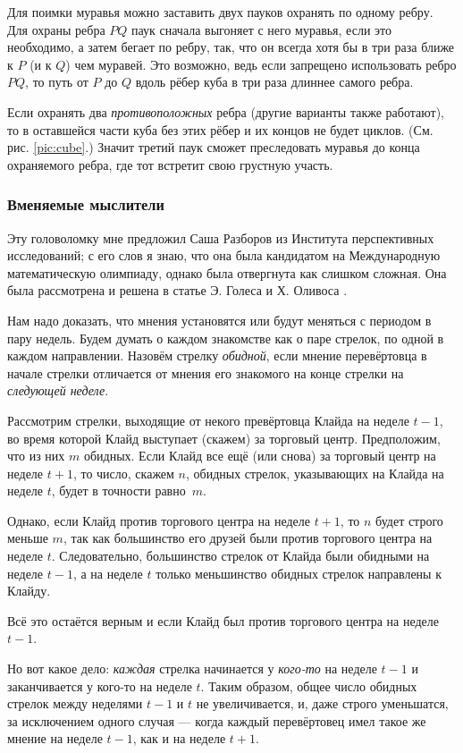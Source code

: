 Для поимки муравья можно заставить двух пауков охранять по одному ребру.
Для охраны ребра $PQ$ паук сначала выгоняет с него муравья, если это необходимо, а затем бегает по ребру, так, что он всегда хотя бы в три раза ближе к $P$ (и к $Q$) чем муравей.
Это возможно, ведь если запрещено использовать ребро $PQ$, то путь от $P$ до $Q$ вдоль рёбер куба в три раза длиннее самого ребра.

Если охранять два \emph{противоположных} ребра (другие варианты также работают), то в оставшейся части куба без этих рёбер и их концов не будет циклов. 
(См. рис. \ref{pic:cube}.)
Значит третий паук сможет преследовать муравья до конца охраняемого ребра, где тот встретит свою грустную участь.

\subsubsection*{Вменяемые мыслители}

Эту головоломку мне предложил Саша Разборов из Института перспективных исследований;
с его слов я знаю, что она была кандидатом на Международную математическую олимпиаду, однако была отвергнута как слишком сложная.
Она была рассмотрена и решена в статье Э. Голеса и Х. Оливоса \cite{31}.

Нам надо доказать, что мнения установятся или будут меняться с периодом в пару недель.
Будем думать о каждом знакомстве как о паре стрелок, по одной в каждом направлении.
Назовём стрелку \emph{обидной}, если мнение перевёртовца в начале стрелки отличается от мнения его знакомого на конце стрелки на \emph{следующей неделе}.

Рассмотрим стрелки, выходящие от некого превёртовца Клайда на неделе $t - 1$, во время которой Клайд выступает (скажем) за торговый центр.
Предположим, что из них $m$ обидных.
Если Клайд все ещё (или снова) за торговый центр на неделе $t + 1$, то число, скажем $n$, обидных стрелок, указывающих на Клайда на неделе $t$, будет в точности равно~$m$.

Однако, если Клайд против торгового центра на неделе $t + 1$, то $n$ будет строго меньше $m$, так как большинство его друзей были против торгового центра на неделе $t$.
Следовательно, большинство стрелок от Клайда были обидными на неделе $t - 1$, а на неделе $t$ только меньшинство обидных стрелок направлены к Клайду.

Всё это остаётся верным и если Клайд был против торгового центра на неделе $t - 1$.

Но вот какое дело: \emph{каждая} стрелка начинается у \emph{кого-то} на неделе $t - 1$ и заканчивается у кого-то на неделе $t$.
Таким образом, общее число обидных стрелок между неделями $t - 1$ и $t$ не увеличивается, и, даже строго уменьшатся, за исключением одного случая --- когда каждый перевёртовец имел такое же мнение на неделе $t - 1$, как и на неделе $t + 1$.

